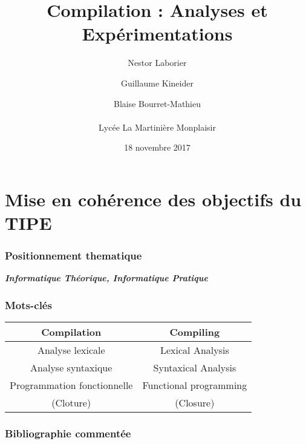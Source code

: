 \documentclass{report}
\title{Compilation : Analyses et Expérimentations}
\author{\bsc Nestor Laborier \and \bsc Guillaume Kineider \and \bsc Blaise Bourret-Mathieu \\ \\ Lycée La Martinière Monplaisir}
\date{18 novembre 2017}
\begin{document}
\maketitle

\part*{Mise en cohérence des objectifs du TIPE}


\section*{Positionnement thematique}
\begin{large}
\emph{\textbf{Informatique Théorique, Informatique Pratique}}
\end{large}

\section*{Mots-clés}

\begin{large}
\begin{center}
\begin{tabular}{c c}
\hline 
Compilation & Compiling \\ 
\hline 
Analyse lexicale & Lexical Analysis \\ 
\hline 
Analyse syntaxique & Syntaxical Analysis\\
\hline
Programmation fonctionnelle & Functional programming\\
\hline
(Cloture) & (Closure)\\
\hline
\end{tabular} 
\end{center}
\end{large}

\section*{Bibliographie commentée}
\end{document}
